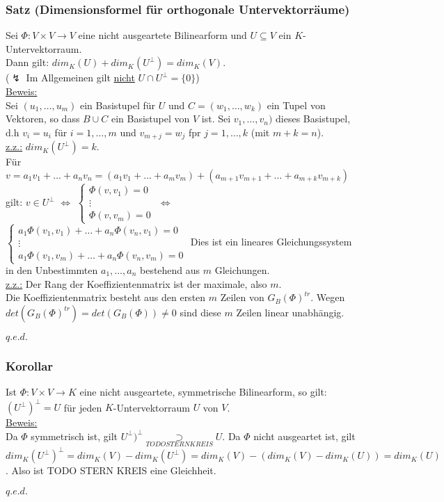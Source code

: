 \documentclass[a4paper]{article}
\newcommand{\ul}{\underline}
\renewcommand{\proof}{\ul{Beweis:}\\}
\renewcommand{\qed}{\begin{flushright}
\ul{\(q.e.d.\)}
\end{flushright}}
\begin{document}
\subsubsection{Satz (Dimensionsformel für orthogonale Untervektorräume)}
Sei \(\Phi:V\times V\rightarrow V\) eine nicht ausgeartete Bilinearform und \(U\subseteq V\) ein \(K\)-Untervektorraum.\\
Dann gilt: \(dim_K(U)+dim_K(U^\bot)=dim_K(V)\).\\
(\(\lightning\) Im Allgemeinen gilt \ul{nicht} \(U\cap U^\bot=\{0\}\))\\
\proof
Sei \((u_1,\dots, u_m)\) ein Basistupel für \(U\) und \(C=(w_1,\dots,w_k)\) ein Tupel von Vektoren, so dass \(B\cup C\) ein Basistupel von \(V\) ist. Sei \(v_1,\dots,v_n)\) dieses Basistupel, d.h \(v_i=u_i\) für \(i=1,\dots,m\) und \(v_{m+j}=w_j\) fpr \(j=1,\dots,k\) (mit \(m+k=n\)).\\
\ul{z.z.:} \(dim_K(U^\bot)=k\).\\
Für \(v=a_1v_1+\dots+a_nv_n=(a_1v_1+\dots+a_mv_m)+(a_{m+1}v_{m+1}+\dots+a_{m+k}v_{m+k})\) gilt: \(v\in U^\bot\) \(\Leftrightarrow\) \(\begin{cases}
\Phi(v,v_1)=0\\
\vdots\\
\Phi(v,v_m)=0
\end{cases}\) \(\Leftrightarrow\) \(\begin{cases}
a_1\Phi(v_1,v_1)+\dots+a_n\Phi(v_n,v_1)=0\\
\vdots\\
a_1\Phi(v_1,v_m)+\dots+a_n\Phi(v_n,v_m)=0
\end{cases}\)
Dies ist ein lineares Gleichungssystem in den Unbestimmten \(a_1,\dots,a_n\) bestehend aus \(m\) Gleichungen.\\
\ul{z.z.:} Der Rang der Koeffizientenmatrix ist der maximale, also \(m\).\\
Die Koeffizientenmatrix besteht aus den ersten \(m\) Zeilen von \(G_B(\Phi)^{tr}\). Wegen \(det(G_B(\Phi)^{tr})=det(G_B(\Phi))\neq 0\) sind diese \(m\) Zeilen linear unabhängig.
\qed
\subsubsection{Korollar}
Ist \(\Phi:V\times V\rightarrow K\) eine nicht ausgeartete, symmetrische Bilinearform, so gilt: \((U^\bot)^\bot=U\) für jeden \(K\)-Untervektorraum \(U\) von \(V\).\\
\proof
Da \(\Phi\) symmetrisch ist, gilt \(U^\bot)^\bot\underset{TODO STERN KREIS}{\supset} U\). Da \(\Phi\) nicht ausgeartet ist, gilt \(dim_K(U^\bot)^\bot=dim_K(V)-dim_K(U^\bot)=dim_K(V)-(dim_K(V)-dim_K(U))=dim_K(U)\). Also ist TODO STERN KREIS eine Gleichheit.
\qed
\end{document}
